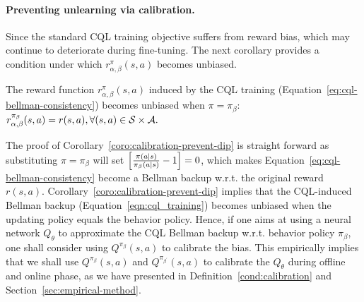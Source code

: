 \paragraph{Preventing unlearning via calibration.}
Since the standard CQL training objective suffers from reward bias, which may continue to deteriorate during fine-tuning. The next corollary provides a condition under which $r^\pi_{\alpha,\beta}(s,a)$ becomes unbiased.
\begin{corollary}
\label{coro:calibration-prevent-dip}
The reward function $r^\pi_{\alpha,\beta}(s,a)$ induced by the CQL training (Equation~\ref{eq:cql-bellman-consistency}) becomes unbiased when $\pi = \pi_\beta$: $r^{\pi_\beta}_{\alpha,\beta}(s,a)=r(s,a),\forall (s,a)\in \mathcal S\times \mathcal A.$
\end{corollary}
The proof of Corollary~\ref{coro:calibration-prevent-dip} is straight forward as substituting $\pi = \pi_\beta$ will set $\left[ \frac{\pi(a|s)}{\pi_\beta(a|s)}-1 \right]=0$, which makes Equation~\ref{eq:cql-bellman-consistency} become a Bellman backup w.r.t. the original reward $r(s,a)$. Corollary~\ref{coro:calibration-prevent-dip} implies that the CQL-induced Bellman backup (Equation~\ref{eqn:cql_training}) becomes unbiased when the updating policy equals the behavior policy. Hence, if one aims at using a neural network $Q_\theta$ to approximate the CQL Bellman backup w.r.t. behavior policy $\pi_\beta$, one shall consider using $Q^{\pi_\beta}(s,a)$ to calibrate the bias. This empirically implies that we shall use $Q^{\pi_\beta}(s,a)$ and $Q^{\pi_{\beta^\prime}}(s,a)$ to calibrate the $Q_\theta$ during offline and online phase, as we have presented in Definition~\ref{cond:calibration} and Section~\ref{sec:empirical-method}.


